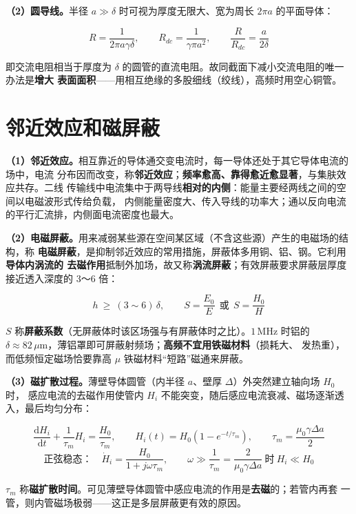 \textbf{（2）圆导线。}半径 $a\gg\delta$ 时可视为厚度无限大、宽为周长 $2\pi a$ 的平面导体：

\begin{formulaBox}
\[
R=\frac{1}{2\pi a\gamma\delta},
\qquad
R_{dc}=\frac{1}{\gamma\pi a^{2}},
\qquad
\frac{R}{R_{dc}}=\frac{a}{2\delta}
\]
\end{formulaBox}
即交流电阻相当于厚度为 $\delta$ 的圆管的直流电阻。故同截面下减小交流电阻的唯一办法是\textbf{增大
表面面积}——用相互绝缘的多股细线（绞线），高频时用空心铜管。


\section{邻近效应和磁屏蔽}

\textbf{（1）邻近效应。}相互靠近的导体通交变电流时，每一导体还处于其它导体电流的场中，电流
分布因而改变，称\textbf{邻近效应}；\textbf{频率愈高、靠得愈近愈显著}，与集肤效应共存。二线
传输线中电流集中于两导线\textbf{相对的内侧}：能量主要经两线之间的空间以电磁波形式传给负载，
内侧能量密度大、传入导线的功率大；通以反向电流的平行汇流排，内侧面电流密度也最大。

\textbf{（2）电磁屏蔽。}用来减弱某些源在空间某区域（不含这些源）产生的电磁场的结构，称
\textbf{电磁屏蔽}，是抑制邻近效应的常用措施，屏蔽体多用铜、铝、钢。它利用\textbf{导体内涡流的
去磁作用}抵制外加场，故又称\textbf{涡流屏蔽}；有效屏蔽要求屏蔽层厚度接近透入深度的 3～6 倍：

\begin{formulaBox}
\[
h\ \geq\ (3\sim6)\,\delta,
\qquad
S=\frac{E_0}{E}\ \ \text{或}\ \ S=\frac{H_0}{H}
\]
\end{formulaBox}
$S$ 称\textbf{屏蔽系数}（无屏蔽体时该区场强与有屏蔽体时之比）。$1\,\mathrm{MHz}$ 时铝的
$\delta\approx82\,\mu\mathrm{m}$，薄铝罩即可屏蔽射频场；\textbf{高频不宜用铁磁材料}（损耗大、
发热重），而低频恒定磁场恰要靠高 $\mu$ 铁磁材料“短路”磁通来屏蔽。

\textbf{（3）磁扩散过程。}薄壁导体圆管（内半径 $a$、壁厚 $\Delta$）外突然建立轴向场 $H_0$ 时，
感应电流的去磁作用使管内 $H_i$ 不能突变，随后感应电流衰减、磁场逐渐透入，最后均匀分布：

\begin{formulaBox}
\[
\frac{\mathrm{d}H_i}{\mathrm{d}t}+\frac{1}{\tau_m}H_i=\frac{H_0}{\tau_m},
\qquad
H_i(t)=H_0\left(1-e^{-t/\tau_m}\right),
\qquad
\tau_m=\frac{\mu_0\gamma\Delta a}{2}
\]
\[
\text{正弦稳态：}\quad
\dot{H}_i=\frac{H_0}{1+j\omega\tau_m},
\qquad
\omega\gg\frac{1}{\tau_m}=\frac{2}{\mu_0\gamma\Delta a}
\ \text{时}\ H_i\ll H_0
\]
\end{formulaBox}
$\tau_m$ 称\textbf{磁扩散时间}。可见薄壁导体圆管中感应电流的作用是\textbf{去磁}的；若管内再套
一管，则内管磁场极弱——这正是多层屏蔽更有效的原因。

